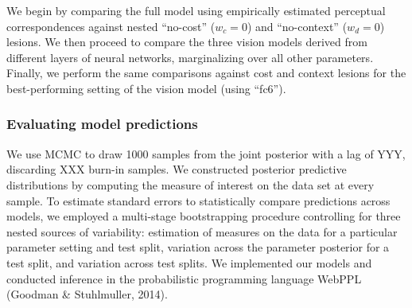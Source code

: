 \documentclass[9pt,twocolumn,twoside]{pnas-new}
\begin{document}
{We begin by comparing the full model using empirically estimated perceptual correspondences against nested ``no-cost'' ($w_c = 0$) and ``no-context'' ($w_d = 0$) lesions. We then proceed to compare the three vision models derived from different layers of neural networks, marginalizing over all other parameters. Finally, we perform the same comparisons against cost and context lesions for the best-performing setting of the vision model (using ``fc6'').

\subsubsection*{Evaluating model predictions}


We use MCMC to draw 1000 samples from the joint posterior with a lag of YYY, discarding XXX burn-in samples.
We constructed posterior predictive distributions by computing the measure of interest on the data set at every sample.
To estimate standard errors to statistically compare predictions across models, we employed a multi-stage bootstrapping procedure controlling for three nested sources of variability: estimation of measures on the data for a particular parameter setting and test split, variation across the parameter posterior for a test split, and variation across test splits.
We implemented our models and conducted inference in the probabilistic programming language WebPPL (Goodman \& Stuhlmuller, 2014).

}

\showmatmethods %


\showacknow{} %



\end{document}
